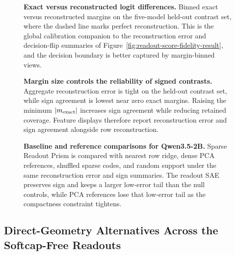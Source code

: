 \begin{figure}[!tbp]
    \centering
    \caption{\textbf{Exact versus reconstructed logit differences.}
    Binned exact versus reconstructed margins on the five-model held-out
    contrast set, where the dashed line marks perfect reconstruction. This is the global
    calibration companion to the reconstruction error and decision-flip
    summaries of Figure~\ref{fig:readout-score-fidelity-result}, and the
    decision boundary is better captured by margin-binned views.}
    \label{fig:app-readout-score-margin-reconstruction}
\end{figure}

\begin{figure}[!tbp]
    \centering
    \caption{\textbf{Margin size controls the reliability of signed contrasts.}
    Aggregate reconstruction error is tight on the held-out contrast set,
    while sign agreement is lowest near zero exact margins. Raising the minimum
    \(|m_{\mathrm{exact}}|\) increases sign agreement while reducing retained
    coverage. Feature displays therefore report reconstruction error and
    sign agreement alongside row reconstruction.}
    \label{fig:app-robustness-margin-reliability}
\end{figure}

\begin{figure}[!tbp]
    \centering
    \caption{\textbf{Baseline and reference comparisons for Qwen3.5-2B.}
    Sparse Readout Prism is compared with nearest row ridge, dense PCA
    references, shuffled sparse codes, and random support under the same
    reconstruction error and sign summaries. The readout SAE
    preserves sign and keeps a larger low-error tail than the null
    controls, while PCA references lose that low-error tail as the
    compactness constraint tightens.}
    \label{fig:app-robustness-baseline-comparisons}
\end{figure}

\subsection{Direct-Geometry Alternatives Across the Softcap-Free Readouts}
\label{app:direct-geometry-grid}

